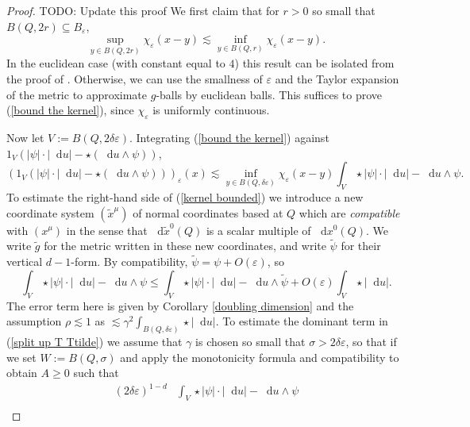 \documentclass[reqno,11pt]{amsart}
\newcommand*\dif{\mathop{}\!\mathrm{d}}
\newcommand{\dfn}[1]{\emph{#1}\index{#1}}
\theoremstyle{definition}
\numberwithin{equation}{section}
\begin{document}
\begin{proof}
TODO: Update this proof We first claim that for $r > 0$ so small that $B(Q, 2r) \subseteq B_\varepsilon$,
\begin{equation}\label{bound the kernel}
\sup_{y \in B(Q, 2r)} \chi_\varepsilon(x - y) \lesssim \inf_{y \in B(Q, r)} \chi_\varepsilon(x - y).
\end{equation}
In the euclidean case (with constant equal to $4$) this result can be isolated from the proof of \cite[Theorem 7.3]{Giusti77}.
Otherwise, we can use the smallness of $\varepsilon$ and the Taylor expansion of the metric to approximate $g$-balls by euclidean balls.
This suffices to prove (\ref{bound the kernel}), since $\chi_\varepsilon$ is uniformly continuous.

Now let $V := B(Q, 2\delta\varepsilon)$.
Integrating (\ref{bound the kernel}) against $1_V(|\psi| \cdot |\dif u| - \star(\dif u \wedge \psi))$,
\begin{equation}\label{kernel bounded}
(1_V(|\psi| \cdot |\dif u| - \star(\dif u \wedge \psi)))_\varepsilon(x) \lesssim \inf_{y \in B(Q, \delta\varepsilon)} \chi_\varepsilon(x - y) \int_V \star |\psi| \cdot |\dif u| - \dif u \wedge \psi.
\end{equation}
To estimate the right-hand side of (\ref{kernel bounded}) we introduce a new coordinate system $(\tilde x^\mu)$ of normal coordinates based at $Q$ which are \dfn{compatible} with $(x^\mu)$ in the sense that $\dif \tilde x^0(Q)$ is a scalar multiple of $\dif x^0(Q)$.
We write $\tilde g$ for the metric written in these new coordinates, and write $\tilde \psi$ for their vertical $d-1$-form.
By compatibility, $\tilde \psi = \psi + O(\varepsilon)$, so
\begin{equation}\label{split up T Ttilde}
\int_V \star |\psi| \cdot |\dif u| - \dif u \wedge \psi \leq \int_V \star |\psi| \cdot |\dif u| - \dif u \wedge \tilde \psi + O(\varepsilon) \int_V \star |\dif u|.
\end{equation}
The error term here is given by Corollary \ref{doubling dimension} and the assumption $\rho \lesssim 1$ as $\lesssim \gamma^2 \int_{B(Q, \delta\varepsilon)} \star |\dif u|$.
To estimate the dominant term in (\ref{split up T Ttilde}) we assume that $\gamma$ is chosen so small that $\sigma > 2\delta\varepsilon$, so that if we set $W := B(Q, \sigma)$ and apply the monotonicity formula and compatibility to obtain $A \geq 0$ such that
\begin{align*}
(2\delta\varepsilon)^{1 - d} &\int_V \star |\psi| \cdot |\dif u| - \dif u \wedge \psi \\

\end{align*}
\end{proof}
\end{document}
